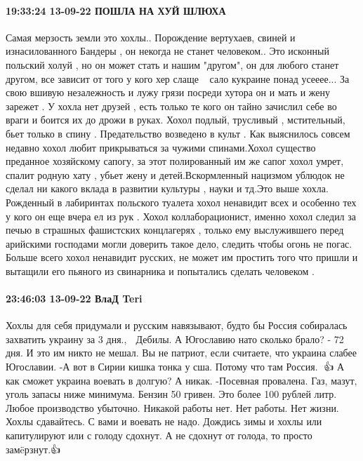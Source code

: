  
 
 
 
 

\paragraph{19:33:24 13-09-22 ПОШЛА НА ХУЙ ШЛЮХА}

Самая мерзость земли это хохлы.. Порождение вертухаев, свиней и изнасилованного
Бандеры , он некогда не станет человеком.. Это исконный польский холуй , но он
может стать и нашим "другом", он для любого станет другом, все зависит от того
у кого хер слаще🤢🤢🤢🤢сало кукраине понад усееее... За свою вшивую
незалежность и лужу грязи посреди хутора он и мать и жену зарежет . У хохла нет
друзей , есть только те кого он тайно зачислил себе во враги и боится их до
дрожи в руках. Хохол подлый, трусливый , мстительный, бьет только в спину .
Предательство возведено в культ . Как выяснилось совсем недавно хохол любит
прикрываться за чужими спинами.Хохол существо преданное хозяйскому сапогу, за
этот полированный им же сапог хохол умрет, спалит родную хату , убьет жену и
детей.Вскормленный нацизмом ублюдок не сделал ни какого вклада в развитии
культуры , науки и тд.Это выше хохла. Рожденный в лабиринтах польского туалета
хохол ненавидит всех и особенно тех у кого он еще вчера ел из рук . Хохол
коллаборационист, именно хохол следил за печью в страшных фашистских
концлагерях , только ему выслужившего перед арийскими господами могли доверить
такое дело, следить чтобы огонь не погас. Больше всего хохол ненавидит русских,
не может им простить того что пришли и вытащили его пьяного из свинарника и
попытались сделать человеком .

\paragraph{23:46:03 13-09-22 ВлаД Teri}

Хохлы для себя придумали и русским навязывают, будто бы Россия собиралась захватить украину за 3 дня., 🙂
Дебилы. А Югославию нато сколько брало?
- 72 дня. И это им никто не мешал.
Вы не патриот, если считаете, что украина слабее Югославии.
-А вот в Сирии кишка тонка у сша. Потому что там Россия. 🙂👍
А как сможет украина воевать в долгую?
А никак.
-Посевная провалена. Газ, мазут, уголь запасы ниже минимума.
Бензин 50 гривен.
Это более 100 рублей литр.
Любое производство убыточно.
Никакой работы нет.
Нет работы. Нет жизни.
Хохлы сдавайтесь.
С вами и воевать не надо. Дождись зимы и хохлы или капитулируют или с голоду сдохнут.
А не сдохнут от голода, то просто замëрзнут.👍

